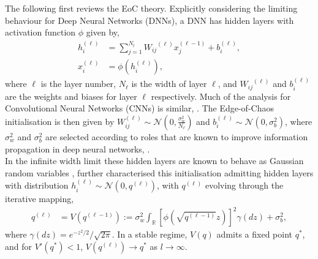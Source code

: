 \documentclass{article}
\theoremstyle{plain}
\theoremstyle{definition}
\theoremstyle{remark}
\begin{document}
The following first reviews the EoC theory. Explicitly considering the limiting behaviour for Deep Neural Networks (DNNs), a DNN has hidden layers with activation function $\phi$ given by,
\begin{equation}
\begin{aligned}
        \label{hidden_layer}
        h_i^{(\ell)} &= \sum_{j=1}^{N_l}{W_{ij}}^{(\ell)} x_j^{(\ell-1)} + b_i^{(\ell)},  \\
        x_i^{(\ell)} &= \phi \left( h_i^{(\ell)} \right),
\end{aligned}
\end{equation}
where $\ell$ is the layer number, $N_{\ell}$ is the width of layer $\ell$, and ${W_{ij}}^{(\ell)}$ and $b_i^{(\ell)}$ are the weights and biases for layer $\ell$ respectively.  Much of the analysis for Convolutional Neural Networks (CNNs) is similar, \cite{xiao_dynamical_2018}.
The Edge-of-Chaos initialisation is then given by $W_{ij}^{(\ell)} \sim \mathcal{N} \left( 0, \frac{\sigma_w^2}{N_{\ell}} \right)$ and $b_i^{(\ell)} \sim \mathcal{N} \left( 0, \sigma_b^2 \right)$, where $\sigma_w^2$ and $\sigma_b^2$ are selected according to roles that are known to improve information propagation in deep neural networks, \cite{schoenholz_deep_2017}. 
 \\
 In the infinite width limit these hidden layers are known to behave as Gaussian random variables \cite{neal_bayesian_1996, matthews_gaussian_2018, lee_deep_2018}, further \cite{poole_exponential_2016} characterised this initialisation admitting hidden layers with distribution $h_i^{(\ell)} \sim \mathcal{N} \left( 0, q^{(\ell)} \right)$, with $q^{(\ell)}$ evolving through the iterative mapping,
 \begin{align}
     q^{(\ell)} &= V \left( q^{(\ell-1)} \right):= {\sigma_w^2}\int_{\mathbb{R}} \left[ \phi \left(\sqrt{q^{(\ell-1)}}z \right) \right] ^2\gamma(dz) + \sigma_b^2,  \label{eq:vmap_general}
 \end{align}
where $\gamma \left( dz \right)=  e^{-z^2/2}/ \sqrt{2 \pi}$.
In a stable regime, $V(q)$ admits a fixed point $q^*$, and for $V'(q^*) < 1$, $V \left(q^{(\ell)} \right) \rightarrow q^*$ as $l \rightarrow \infty$. 
\end{document}
